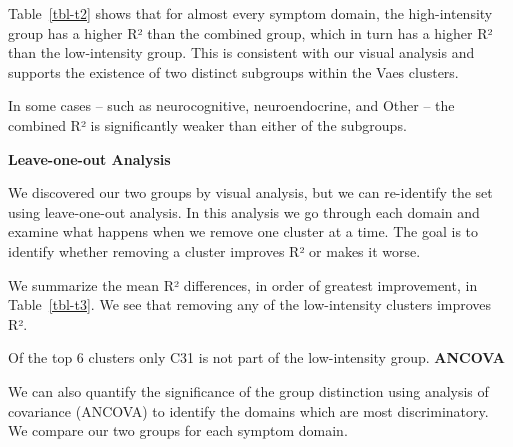 \documentclass[
  letterpaper,
  DIV=11,
  numbers=noendperiod]{scrartcl}
\begin{document}
Table~\ref{tbl-t2} shows that for almost every symptom domain, the
high-intensity group has a higher R² than the combined group, which in
turn has a higher R² than the low-intensity group. This is consistent
with our visual analysis and supports the existence of two distinct
subgroups within the Vaes clusters.

In some cases -- such as neurocognitive, neuroendocrine, and Other --
the combined R² is significantly weaker than either of the subgroups.

\FloatBarrier
\bigskip

\textbf{Leave-one-out Analysis}

We discovered our two groups by visual analysis, but we can re-identify
the set using leave-one-out analysis. In this analysis we go through
each domain and examine what happens when we remove one cluster at a
time. The goal is to identify whether removing a cluster improves R² or
makes it worse.

We summarize the mean R² differences, in order of greatest improvement,
in Table~\ref{tbl-t3}. We see that removing any of the low-intensity
clusters improves R².

\begin{table}[h]

\caption{\label{tbl-t3}Leave-one-out Analysis}


\end{table}%

Of the top 6 clusters only C31 is not part of the low-intensity group.
\FloatBarrier \bigskip \textbf{ANCOVA}

We can also quantify the significance of the group distinction using
analysis of covariance (ANCOVA) to identify the domains which are most
discriminatory. We compare our two groups for each symptom domain.
\end{document}

